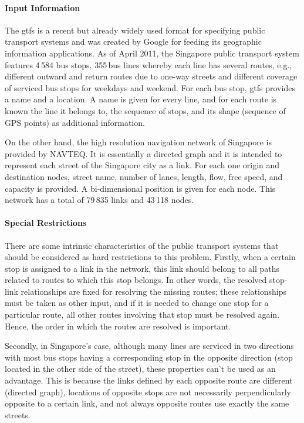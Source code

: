 \paragraph{Input Information}

The \gls{gtfs} is a recent but already widely used format for specifying public transport systems and was created by Google for feeding its geographic information applications. As of April 2011, the Singapore public transport system features 4\,584 bus stops, 355\,bus lines whereby each line has several routes, e.g., different outward and return routes due to one-way streets and different coverage of serviced bus stops for weekdays and weekend. For each bus stop, \gls{gtfs} provides a name and a location. A name is given for every line, and for each route is known the line it belongs to, the sequence of stops, and its shape (sequence of GPS points) as additional information.

On the other hand, the high resolution navigation network of Singapore is provided by NAVTEQ. It is essentially a directed graph and it is intended to represent each street of the Singapore city as a link. For each one origin and destination nodes, street name, number of lanes, length, flow, free speed, and capacity is provided. A bi-dimensional position is given for each node. This network has a total of 79\,835 links and 43\,118 nodes.

\paragraph{Special Restrictions}

There are some intrinsic characteristics of the public transport systems that should be considered as hard restrictions to this problem. Firstly, when a certain stop is assigned to a link in the network, this link should belong to all paths related to routes to which this stop belongs. In other words, the resolved stop-link relationships are fixed for resolving the missing routes; these relationships must be taken as other input, and if it is needed to change one stop for a particular route, all other routes involving that stop must be resolved again. Hence, the order in which the routes are resolved is important.

Secondly, in Singapore's case, although many lines are serviced in two directions with most bus stops having a corresponding stop in the opposite direction (stop located in the other side of the street), these properties can't be used as an advantage. This is because the links defined by each opposite route are different (directed graph), locations of opposite stops are not necessarily perpendicularly opposite to a certain link, and not always opposite routes use exactly the same streets.

